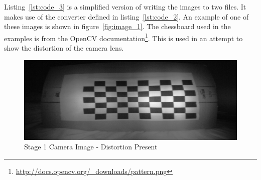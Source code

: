\documentclass[11pt,oneside]{report}
\newcommand\code[1]{\texttt{#1}}
\begin{document}
		Listing~\ref{lst:code_3} is a simplified version of writing the images to two files.
		It makes use of the converter defined in listing~\ref{lst:code_2}.
		An example of one of these images is shown in figure~\ref{fig:image_1}.
		The chessboard used in the examples is from the OpenCV documentation\footnote{\url{http://docs.opencv.org/_downloads/pattern.png}}.
		This is used in an attempt to show the distortion of the camera lens.
		\begin{figure}[h]
			\centering
    				\includegraphics[width=\textwidth]{1}
    				\caption{Stage 1 Camera Image - Distortion Present \protect {\label{fig:image_1}}}
		\end{figure}	
		
		
		\clearpage
			
\end{document}
